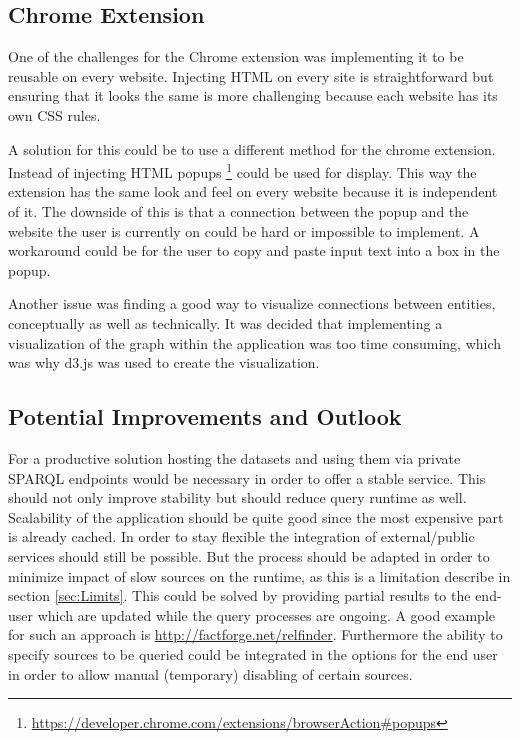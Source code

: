 \subsection{Chrome Extension}
One of the challenges for the Chrome extension was implementing it to be reusable on every website. Injecting HTML on every site is straightforward but ensuring that it looks the same is more challenging because each website has its own CSS rules.

A solution for this could be to use a different method for the chrome extension. Instead of injecting HTML popups \footnote{\url{https://developer.chrome.com/extensions/browserAction\#popups}} could be used for display. This way the extension has the same look and feel on every website because it is independent of it. The downside of this is that a connection between the popup and the website the user is currently on could be hard or impossible to implement. A workaround could be for the user to copy and paste input text into a box in the popup. 

Another issue was finding a good way to visualize connections between entities, conceptually as well as technically. It was decided that implementing a visualization of the graph within the application was too time consuming, which was why d3.js was used to create the visualization.





\subsection{Potential Improvements and Outlook}
For a productive solution hosting the datasets and using them via private SPARQL endpoints would be necessary in order to offer a stable service. This should not only improve stability but should reduce query runtime as well. Scalability of the application should be quite good since the most expensive part is already cached. 
In order to stay flexible the integration of external/public services should still be possible. But the process should be adapted in order to minimize impact of slow sources on the runtime, as this is a limitation describe in section \ref{sec:Limits}. This could be solved by providing partial results to the end-user which are updated while the query processes are ongoing. A good example for such an approach is \url{http://factforge.net/relfinder}. Furthermore the ability to specify sources to be queried could be integrated in the options for the end user in order to allow manual (temporary) disabling of certain sources. 

